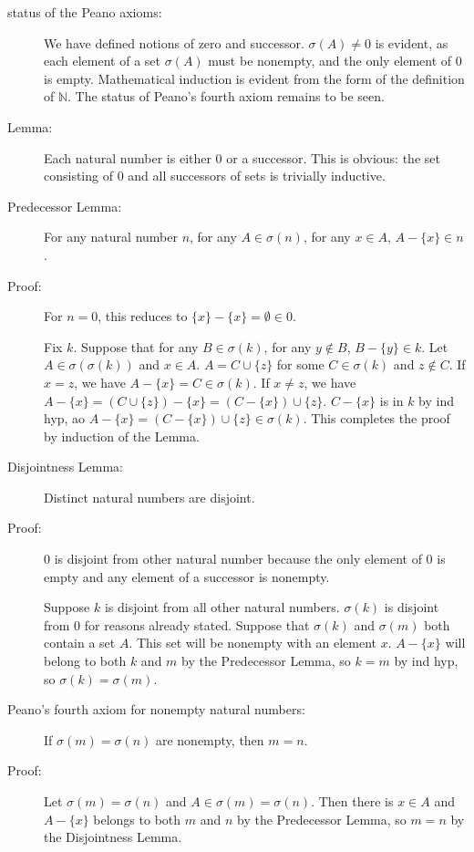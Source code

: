 \documentclass[12pt]{article}
\begin{document}
\begin{description}
\item[status of the Peano axioms:]  We have defined notions of zero and successor.   $\sigma(A) \neq 0$ is evident, as each element of a set $\sigma(A)$ must be nonempty, and the only element of 0 is empty.
Mathematical induction is evident from the form of the definition of $\mathbb N$.  The status of Peano's fourth axiom remains to be seen.

\item[Lemma:]  Each natural number is either 0 or a successor.  This is obvious:  the set consisting of 0 and all successors of sets is trivially inductive.

\item[Predecessor Lemma:]  For any natural number $n$, for any $A \in \sigma(n)$, for any $x \in A$, $A - \{x\} \in n$. 

\item[Proof:]  For $n=0$, this reduces to $\{x\}-\{x\} = \emptyset \in 0$. 

Fix $k$.  Suppose that for any $B \in \sigma(k)$, for any $y \not\in B$, $B -\{y\} \in k$.  Let $A \in \sigma(\sigma(k))$ and $x \in A$.
$A=C \cup \{z\}$ for some $C \in \sigma(k)$ and $z \not\in C$.  If $x=z$, we have $A - \{x\} = C \in \sigma(k)$.  If $x \neq z$, we have $A - \{x\} = (C \cup \{z\}) - \{x\} = (C - \{x\}) \cup \{z\}$.  $C - \{x\}$ is in $k$ by ind hyp, ao 
$A - \{x\} = (C - \{x\}) \cup \{z\} \in \sigma(k)$.  This completes the proof by induction of the Lemma.

\item[Disjointness Lemma:]  Distinct natural numbers are disjoint.

\item[Proof:]  0 is disjoint from other natural number because the only element of 0 is empty and any element of a successor is nonempty.

Suppose $k$ is disjoint from all other natural numbers.  $\sigma(k)$ is disjoint from 0 for reasons already stated.  Suppose that $\sigma(k)$ and $\sigma(m)$ both contain a set $A$.  This set will be nonempty with an element $x$.  $A-\{x\}$ will belong to both $k$ and $m$ by the Predecessor Lemma, so $k=m$ by ind hyp, so $\sigma(k)=\sigma(m)$.

\item[Peano's fourth axiom for nonempty natural numbers:]  If $\sigma(m)=\sigma(n)$ are nonempty, then $m=n$.

\item[Proof:]  Let $\sigma(m)=\sigma(n)$ and $A \in \sigma(m)=\sigma(n)$.  Then there is $x \in A$ and $A-\{x\}$ belongs to both $m$ and $n$ by the Predecessor Lemma, so $m=n$ by the Disjointness Lemma.


\end{description}
\end{document}
